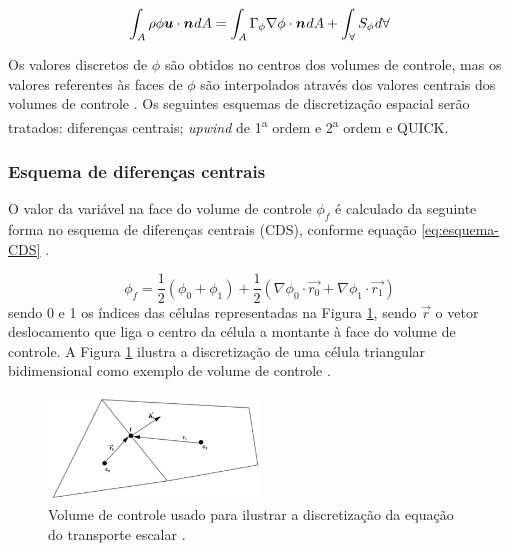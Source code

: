 \begin{equation}
    \label{eq:volumes-finitos-estacionaria}
    \int_{A} \rho\phi\boldsymbol{u}\cdot\boldsymbol{n}\hspace{0.5pt} dA = \int_{A} \Gamma_{\phi}\nabla\phi\cdot\boldsymbol{n}\hspace{0.5pt} dA + \int_{\forall} S_{\phi}\hspace{0.5pt} d\forall
\end{equation}

Os valores discretos de \(\phi\) são obtidos no centros dos volumes de controle, mas os valores referentes às faces de \(\phi\) são interpolados através dos valores centrais dos volumes de controle \cite{Rezende2009}. Os seguintes esquemas de discretização espacial serão tratados: diferenças centrais; \textit{upwind} de 1\textsuperscript{a} ordem e 2\textsuperscript{a} ordem e QUICK.

\subsubsection{Esquema de diferenças centrais}

O valor da variável na face do volume de controle \(\phi_{f}\) é calculado da seguinte forma no esquema de diferenças centrais (CDS), conforme equação \ref{eq:esquema-CDS} \cite{Rezende2009}.

\begin{equation}
    \label{eq:esquema-CDS}
    \phi_f = \frac{1}{2}\left(\phi_0+\phi_1\right)+\frac{1}{2}\left(\nabla\phi_0\cdot\overrightarrow{r_0}+\nabla\phi_1\cdot\overrightarrow{r_1}\right)
\end{equation}
%
sendo 0 e 1 os índices das células representadas na Figura \ref{fig:volume-ANSYS-2021R2}, sendo \(\overrightarrow{r}\) o vetor deslocamento que liga o centro da célula a montante à face do volume de controle. A Figura \ref{fig:volume-ANSYS-2021R2} ilustra a discretização de uma célula triangular bidimensional como exemplo de volume de controle \cite{fluent2021ansys}.

\begin{figure}[!ht] 
	\centering
	\includegraphics[width=0.5\textwidth]{foto01-volume-fluent.png}
    \caption[Volume de controle usado para ilustrar a discretização da equação do transporte escalar.]{Volume de controle usado para ilustrar a discretização da equação do transporte escalar \cite{fluent2021ansys}.}
	\label{fig:volume-ANSYS-2021R2}
\end{figure}

